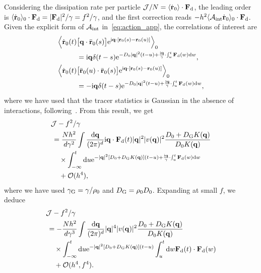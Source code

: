 \documentclass[superscriptaddress, twocolumn, prx, longbibliography, nofootinbib]{revtex4-1}
\begin{document}
Considering the dissipation rate per particle ${\cal J}/N=\langle\dot{\bf r}_0\rangle\cdot{\bf F}_{\rm d}$, the leading order is $\langle\dot{\bf r}_0\rangle_0 \cdot {\bf F}_{\rm d} = |{\bf F}_{\rm d}|^2/\gamma = f^2/\gamma$, and the first correction reads $ - h^2 \langle{\cal A}_{\rm int}\dot{\bf r}_0\rangle_0 \cdot {\bf F}_{\rm d} $. Given the explicit form of ${\cal A}_{\rm int}$ in~\eqref{eq:action_app}, the correlations of interest are
\begin{equation}
	\begin{aligned}
		\Big\langle\dot{\bf r}_0(t) &\big[{\bf q}\cdot\bar{\bf r}_0(s)\big] {\rm e}^{{\rm i}{\bf q}\cdot[{\bf r}_0(s)-{\bf r}_0(u)]}\Big\rangle_0
		\\
		&= {\rm i}{\bf q}\delta(t-s){\rm e}^{ - D_0|{\bf q}|^2(t-u) + \frac{{\rm i}{\bf q}}{\gamma}\cdot\int_u^t {\bf F}_{\rm d}(w) {\rm d}w} ,
		\\
		\Big\langle\dot{\bf r}_0(t) &\big[\bar{\bf r}_0(u)\cdot\bar{\bf r}_0(s)\big] {\rm e}^{{\rm i}{\bf q}\cdot[{\bf r}_0(s)-{\bf r}_0(u)]}\Big\rangle_0
		\\
		&= -{\rm i}{\bf q}\delta(t-s){\rm e}^{ - D_0|{\bf q}|^2(t-u) + \frac{{\rm i}{\bf q}}{\gamma}\cdot\int_u^t {\bf F}_{\rm d}(w) {\rm d}w} ,
	\end{aligned}
\end{equation}
where we have used that the tracer statistics is Gaussian in the absence of interactions, following~\cite{Demery2011, Demery2014}. From this result, we get
\begin{equation}
	\begin{aligned}
		&{\cal J} - f^2/\gamma
		\\
		&\,= \frac{Nh^2}{d\gamma^2} \int \frac{{\rm d}{\bf q}}{(2\pi)^d} {\rm i}{\bf q}\cdot{\bf F}_{\rm d}(t) |{\bf q}|^2 |v({\bf q})|^2 \frac{D_0+D_{\rm G}K({\bf q})}{D_0K({\bf q})}
		\\
		&\,\quad\times \int_{-\infty}^t {\rm d}u {\rm e}^{-|{\bf q}|^2 [D_0+D_{\rm G} K({\bf q})](t-u) + \frac{{\rm i}{\bf q}}{\gamma}\cdot\int_u^t{\bf F}_{\rm d}(w){\rm d}w}
		\\
		&\,\quad + {\cal O}(h^4) ,
	\end{aligned}
\end{equation}
where we have used $\gamma_{\rm G}=\gamma/\rho_0$ and $D_{\rm G}=\rho_0D_0$. Expanding at small $f$, we deduce
\begin{equation}\label{eq:diss}
	\begin{aligned}
		&{\cal J} - f^2/\gamma
		\\
		&\,= - \frac{Nh^2}{d\gamma^3} \int \frac{{\rm d}{\bf q}}{(2\pi)^d} |{\bf q}|^4 |v({\bf q})|^2 \frac{D_0+D_{\rm G}K({\bf q})}{D_0K({\bf q})}
		\\
		&\,\quad\times \int_{-\infty}^t {\rm d}u {\rm e}^{-|{\bf q}|^2 [D_0+D_{\rm G} K({\bf q})](t-u)} \int_u^t{\rm d}w{\bf F}_{\rm d}(t)\cdot{\bf F}_{\rm d}(w)
		\\
		&\,\quad + {\cal O}(h^4,f^4) .
	\end{aligned}
\end{equation}
\end{document}
